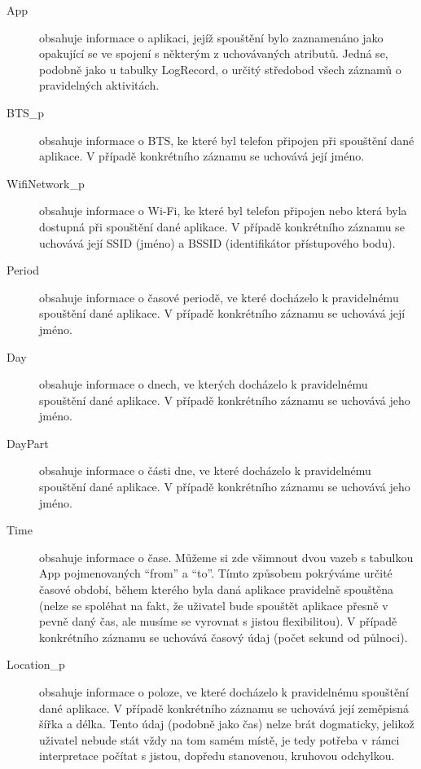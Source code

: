 \documentclass[thesis=M,czech]{FITthesis}[2012/06/26]
\begin{document}
\begin{description}
\item[App]
obsahuje informace o aplikaci, jejíž spouštění bylo zaznamenáno jako opakující se ve spojení s některým z uchovávaných atributů. Jedná se, podobně jako u tabulky LogRecord, o určitý středobod všech záznamů o pravidelných aktivitách.

\item[BTS\_p]
obsahuje informace o BTS, ke které byl telefon připojen při spouštění dané aplikace. V případě konkrétního záznamu se uchovává její jméno.

\item[WifiNetwork\_p]
obsahuje informace o Wi-Fi, ke které byl telefon připojen nebo která byla dostupná při spouštění dané aplikace. V případě konkrétního záznamu se uchovává její SSID (jméno) a BSSID (identifikátor přístupového bodu).

\item[Period]
obsahuje informace o časové periodě, ve které docházelo k pravidelnému spouštění dané aplikace. V případě konkrétního záznamu se uchovává její jméno.

\item[Day]
obsahuje informace o dnech, ve kterých docházelo k pravidelnému spouštění dané aplikace. V případě konkrétního záznamu se uchovává jeho jméno.

\item[DayPart]
obsahuje informace o části dne, ve které docházelo k pravidelnému spouštění dané aplikace. V případě konkrétního záznamu se uchovává jeho jméno.

\item[Time]
obsahuje informace o čase. Můžeme si zde všimnout dvou vazeb s tabulkou App pojmenovaných “from” a “to”. Tímto způsobem pokrýváme určité časové období, během kterého byla daná aplikace pravidelně spouštěna (nelze se spoléhat na fakt, že uživatel bude spouštět aplikace přesně v pevně daný čas, ale musíme se vyrovnat s jistou flexibilitou). V případě konkrétního záznamu se uchovává časový údaj (počet sekund od půlnoci).

\item[Location\_p]
obsahuje informace o poloze, ve které docházelo k pravidelnému spouštění dané aplikace. V případě konkrétního záznamu se uchovává její zeměpisná šířka a délka. Tento údaj (podobně jako čas) nelze brát dogmaticky, jelikož uživatel nebude stát vždy na tom samém místě, je tedy potřeba v rámci interpretace počítat s jistou, dopředu stanovenou, kruhovou odchylkou.
\end{description}
\end{document}
